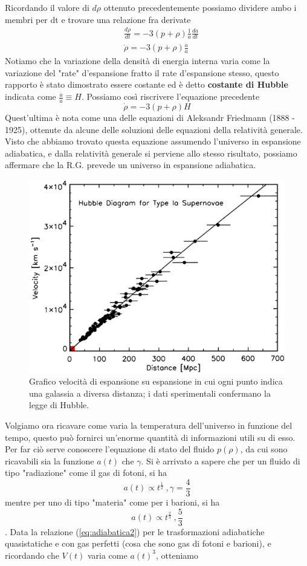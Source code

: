 \documentclass[10pt,a4paper]{article}
\begin{document}
Ricordando il valore di $d\rho$ ottenuto precedentemente possiamo dividere ambo i membri per dt e trovare una relazione fra derivate
\begin{align*}
	&\frac{d\rho}{dt} = -3(p + \rho)\frac{1}{a}\frac{da}{dt}\\\
	&\dot{\rho} = -3(p + \rho)\frac{\dot{a}}{a}
\end{align*}
Notiamo che la variazione della densità di energia interna varia come la variazione del "rate" d'espansione fratto il rate d'espansione stesso, questo rapporto è stato dimostrato essere costante ed è detto \textbf{costante di Hubble} indicata come \(\frac{\dot{a}}{a}\equiv H\).  Possiamo così riscrivere l'equazione precedente
\[\dot{\rho} = -3(p+\rho) H\]
Quest'ultima è nota come una delle equazioni di Aleksandr Friedmann (1888 - 1925), ottenute da alcune delle soluzioni delle equazioni della relatività generale. Visto che abbiamo trovato questa equazione assumendo l'universo in espansione adiabatica, e dalla relatività generale si perviene allo stesso risultato, possiamo affermare che la R.G. prevede un universo in espansione adiabatica. 
\begin{figure}[h!]
	\centering
	\includegraphics[width=0.6\linewidth]{../images/Hubble}
	\caption{Grafico velocità di espansione su espansione in cui ogni punto indica una galassia a diversa distanza; i dati sperimentali confermano la legge di Hubble.}
	\label{fig:hubble}
\end{figure}
\FloatBarrier
Volgiamo ora ricavare come varia la temperatura dell'universo in funzione del tempo, questo può fornirci un'enorme quantità di informazioni utili su di esso.\\
Per far ciò serve conoscere l'equazione di stato del fluido \(p(\rho)\), da cui sono ricavabili sia la funzione \(a(t)\) che $\gamma$. Si è arrivato a sapere che per un fluido di tipo "radiazione" come il gas di fotoni, si ha \[a(t)\propto t^{\frac{1}{2}}\ , \gamma = \frac{4}{3}\] mentre per uno di tipo "materia" come per i barioni, si ha \[a(t)\propto t^{\frac{2}{3}}\ , \frac{5}{3}\]. Data la relazione (\ref{eq:adiabatica2}) per le trasformazioni adiabatiche quasistatiche e con gas perfetti (cosa che sono gas di fotoni e barioni), e ricordando che \(V(t)\) varia come \(a(t)^3\), otteniamo
\end{document}
